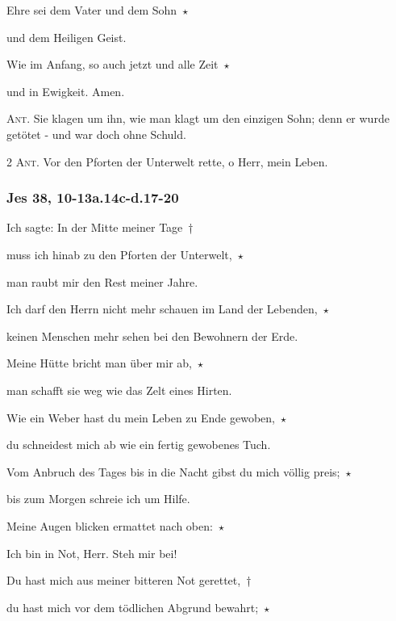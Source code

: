 \noindent Ehre sei dem Vater und dem Sohn~$\star$~\nopagebreak

und dem Heiligen Geist.

\noindent Wie im Anfang, so auch jetzt und alle Zeit~$\star$~\nopagebreak

und in Ewigkeit. Amen.

\vspace{10pt}

\noindent \textsc{Ant.} Sie klagen um ihn, wie man klagt um den einzigen Sohn; denn er wurde getötet - und war doch ohne Schuld.

\vspace{10pt}

\noindent \textsc{2 Ant.} Vor den Pforten der Unterwelt rette, o Herr, mein Leben.

\subsubsection{Jes 38, 10-13a.14c-d.17-20}

\noindent Ich sagte: In der Mitte meiner Tage~†~\nopagebreak

muss ich hinab zu den Pforten der Unterwelt,~$\star$~\nopagebreak

man raubt mir den Rest meiner Jahre.

\noindent Ich darf den Herrn nicht mehr schauen im Land der Lebenden,~$\star$~\nopagebreak

keinen Menschen mehr sehen bei den Bewohnern der Erde.

\noindent Meine Hütte bricht man über mir ab,~$\star$~\nopagebreak

man schafft sie weg wie das Zelt eines Hirten. 

\noindent Wie ein Weber hast du mein Leben zu Ende gewoben,~$\star$~\nopagebreak

du schneidest mich ab wie ein fertig gewobenes Tuch. 

\noindent Vom Anbruch des Tages bis in die Nacht gibst du mich völlig preis;~$\star$~\nopagebreak

bis zum Morgen schreie ich um Hilfe.

\noindent Meine Augen blicken ermattet nach oben:~$\star$~\nopagebreak

Ich bin in Not, Herr. Steh mir bei!

\noindent Du hast mich aus meiner bitteren Not gerettet,~†~\nopagebreak

du hast mich vor dem tödlichen Abgrund bewahrt;~$\star$~\nopagebreak

